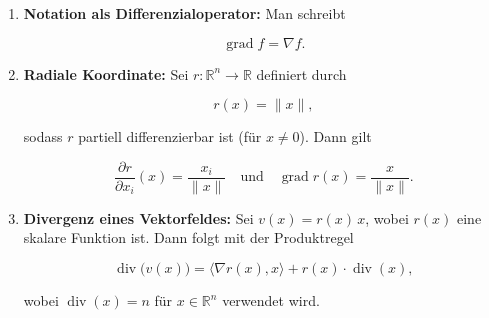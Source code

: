 \begin{beispielbox}
\begin{enumerate}
  \item \textbf{Notation als Differenzialoperator:} Man schreibt
  

\[
  \operatorname{grad} f = \nabla f.
  \]


  
  \item \textbf{Radiale Koordinate:} Sei \( r : \mathbb{R}^n \to \mathbb{R} \) definiert durch
  

\[
  r(x) = \|x\|,
  \]


  sodass \( r \) partiell differenzierbar ist (für \( x\neq 0 \)). Dann gilt
  

\[
  \frac{\partial r}{\partial x_i}(x)= \frac{x_i}{\|x\|} \quad\text{und}\quad \operatorname{grad} r(x)= \frac{x}{\|x\|}.
  \]


  
  \item \textbf{Divergenz eines Vektorfeldes:} Sei \( v(x) = r(x)\, x \), wobei \( r(x) \) eine skalare Funktion ist. Dann folgt mit der Produktregel
  

\[
  \operatorname{div}\bigl( v(x) \bigr)= \langle \nabla r(x), x \rangle + r(x) \cdot \operatorname{div}(x),
  \]


  wobei \( \operatorname{div}(x)=n \) für \( x\in \mathbb{R}^n \) verwendet wird.
\end{enumerate}
\end{beispielbox}
